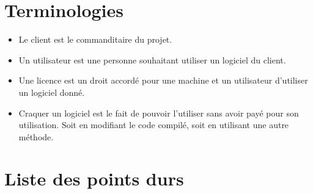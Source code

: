 \chapter{Terminologies}

\begin{itemize}
	\item Le client est le commanditaire du projet.
	\item Un utilisateur est une personne souhaitant utiliser un logiciel du client. 
	\item Une licence est un droit accordé pour une machine et un utilisateur d'utiliser un logiciel donné.
	\item Craquer un logiciel est le fait de pouvoir l'utiliser sans avoir payé pour son utilisation. Soit en modifiant le code compilé, soit en utilisant une autre méthode. 
\end{itemize}

\chapter{Liste des points durs}

